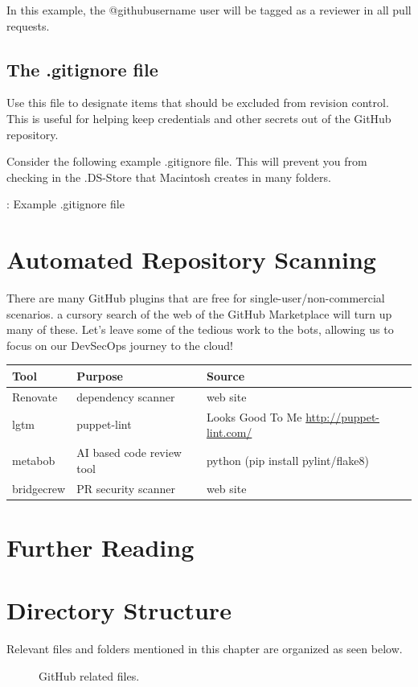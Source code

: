 \justify{}
In this example, the @githubusername user will be tagged as a reviewer in all pull requests.

\subsection{The .gitignore file}

\justify{}
Use this file to designate items that should be excluded from revision
control. This is useful for helping keep credentials and other secrets out of the GitHub repository.

\justify{}
Consider the following example .gitignore file. This will prevent you from checking in the .DS-Store that
Macintosh creates in many folders.

\begin{mybox}{\thetcbcounter: Example .gitignore file}
      
\end{mybox}

\section{Automated Repository Scanning}

\justify{}
There are many GitHub plugins that are free for single-user/non-commercial scenarios. a cursory search of the web of the
GitHub Marketplace will turn up many of these. Let's leave some of the
tedious work to the bots, allowing us to focus on our DevSecOps journey to the cloud!

\justify{}
\begin{tabular}{| p{2.3cm}| p{4.5cm} | p{8.5cm} |}
      \hline
      \textbf{Tool}& \textbf{Purpose}& \textbf{Source} \\
      \hline
      Renovate & dependency scanner & web site \\
      \hline
      lgtm & puppet-lint & Looks Good To Me \url{http://puppet-lint.com/} \\
      \hline
      metabob & AI based code review tool & python (pip install pylint/flake8) \\
      \hline
      bridgecrew & PR security scanner & web site \\
      \hline
\end{tabular}

\section{Further Reading}

\clearpage

\section{Directory Structure}

\justify{}
Relevant files and folders mentioned in this chapter are organized as
seen below.

\begin{figure}[!htb]
      \centering
      
      \caption{GitHub related files.}
      \label{githubfiles}
\end{figure}
